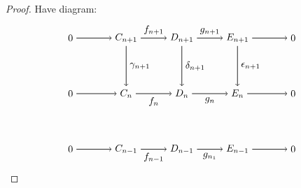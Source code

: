 \documentclass[11.5pt, twoside, a4paper, titlepage]{report}
\theoremstyle{definition}
\theoremstyle{plain}
\begin{document}
\begin{proof}
Have diagram:
\begin{equation*}
\begin{tikzpicture}[->,-latex, auto, main path/.style={->, semithick}, main node/.style={}]

\node	[main node]		(2) at (2,0)		{$0$};
\node	[main node]		(3) at (4,0)		{$C_{n+1}$};
\node [main node]		(4) at (6,0)		{$D_{n+1}$};
\node [main node]		(5) at (8,0)		{$E_{n+1}$};
\node	[main node]		(11) at (10,0)	{$0$};


\node	[main node]		(7) at (2,-2)		{$0$};
\node	[main node]		(8) at (4,-2)		{$C_n$};
\node [main node]		(9) at (6,-2)		{$D_n$};
\node [main node]		(10) at (8,-2)	{$E_n$};
\node [main node]		(13) at (10,-2)	{$0$};


\node	[main node]		(14) at (2,-4)	{$0$};
\node	[main node]		(15) at (4,-4)	{$C_{n-1}$};
\node [main node]		(16) at (6,-4)	{$D_{n-1}$};
\node [main node]		(17) at (8,-4)	{$E_{n-1}$};
\node [main node]		(18) at (10,-4)	{$0$};

\draw (2) edge [main path] node [auto] {$$} (3);
\draw (3) edge [main path] node [auto] {$f_{n+1}$} (4);
\draw (4) edge [main path] node [auto] {$g_{n+1}$} (5);
\draw (5) edge [main path] (11);

\draw (7) edge [main path] node [auto] {$$} (8);
\draw (8) edge [main path] node [auto, swap] {$f_n$} (9);
\draw (9) edge [main path] node [auto, swap] {$g_n$} (10);
\draw (10) edge [main path] (13);

\draw (14) edge [main path] node [auto] {$$} (15);
\draw (15) edge [main path] node [auto, swap] {$f_{n-1}$} (16);
\draw (16) edge [main path] node [auto, swap] {$g_{n_1}$} (17);
\draw (17) edge [main path] (18);

\draw (3) edge [main path] node [auto] {$\gamma_{n+1}$} (8);
\draw (4) edge [main path] node [auto] {$\delta_{n+1}$} (9);
\draw (5) edge [main path] node [auto] {$\epsilon_{n+1}$} (10);


\end{tikzpicture}
\end{equation*}
\end{proof}
\end{document}
